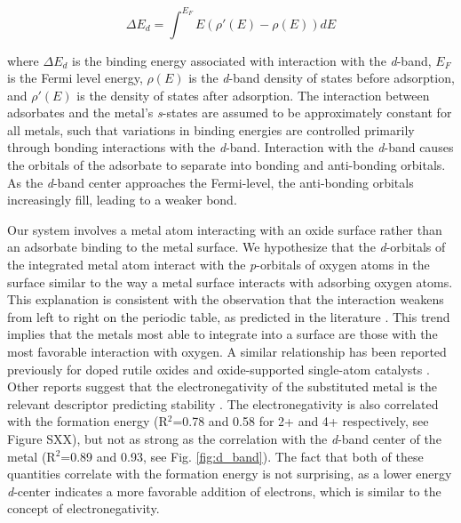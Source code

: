 \begin{equation}
    \Delta E_d = \int^{E_F} E(\rho'(E) - \rho(E))dE
    \label{eq:d_band}
\end{equation}

where $\Delta E_d$ is the binding energy associated with interaction with the \textit{d}-band, $E_F$ is the Fermi level energy, $\rho(E)$ is the \textit{d}-band density of states before adsorption, and $\rho'(E)$ is the density of states after adsorption. The interaction between adsorbates and the metal's \textit{s}-states are assumed to be approximately constant for all metals, such that variations in binding energies are controlled primarily through bonding interactions with the \textit{d}-band. Interaction with the \textit{d}-band causes the orbitals of the adsorbate to separate into bonding and anti-bonding orbitals. As the \textit{d}-band center approaches the Fermi-level, the anti-bonding orbitals increasingly fill, leading to a weaker bond.

Our system involves a metal atom interacting with an oxide surface rather than an adsorbate binding to the metal surface. We hypothesize that the \textit{d}-orbitals of the integrated metal atom interact with the \textit{p}-orbitals of oxygen atoms in the surface similar to the way a metal surface interacts with adsorbing oxygen atoms. This explanation is consistent with the observation that the interaction weakens from left to right on the periodic table, as predicted in the literature \cite{Hammer_2000}. This trend implies that the metals most able to integrate into a surface are those with the most favorable interaction with oxygen. A similar relationship has been reported previously for doped rutile oxides \cite{Xu_2015} and oxide-supported single-atom catalysts \cite{O_Connor_2018}. Other reports suggest that the electronegativity of the substituted metal is the relevant descriptor predicting stability \cite{Garc_a_Mota_2011}. The electronegativity is also correlated with the formation energy (R$^2$=0.78 and 0.58 for 2+ and 4+ respectively, see Figure SXX), but not as strong as the correlation with the \textit{d}-band center of the metal (R$^2$=0.89 and 0.93, see Fig. \ref{fig:d_band}). The fact that both of these quantities correlate with the formation energy is not surprising, as a lower energy \textit{d}-center indicates a more favorable addition of electrons, which is similar to the concept of electronegativity. %


